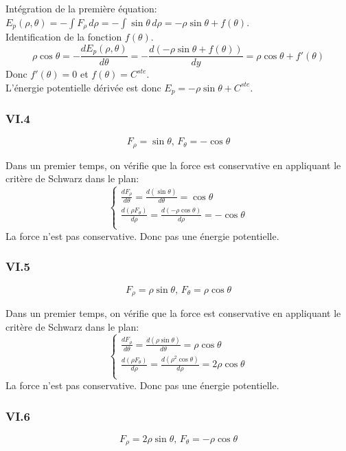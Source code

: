 \documentclass[]{book}
\theoremstyle{definition}
\begin{document}
Int\'egration de la premi\`ere \'equation: $E_p(\rho,\theta) = -\int{F_{\rho}\, d\rho} = -\int{\sin \theta\, d\rho} = -\rho \sin \theta + f(\theta)$.\\
Identification de la fonction $f(\theta)$. 
$$\rho \cos \theta = -\frac{dE_p(\rho,\theta)}{d\theta} = -\frac{d(-\rho \sin \theta + f(\theta))}{dy} = \rho \cos \theta + f'(\theta)$$
Donc $f'(\theta) = 0$ et $f(\theta) = C^{ste}$.\\

L'\'energie potentielle d\'eriv\'ee est donc $E_p = -\rho \sin \theta + C^{ste}$.

\subsubsection*{VI.4}
$$F_{\rho} = \sin \theta,\, F_{\theta} = -\cos \theta$$

Dans un premier temps, on v\'erifie que la force est conservative en appliquant le crit\`ere de Schwarz dans le plan:
$$
\left\{
\begin{array}{l }
	\frac{dF_{\rho}}{d\theta} = \frac{d(\sin \theta)}{d\theta} = \cos \theta\\
	\frac{d(\rho F_{\theta})}{d\rho} = \frac{d(-\rho \cos \theta)}{d\rho} = -\cos \theta\\
\end{array}
\right. 
$$
La force n'est pas conservative. Donc pas une \'energie potentielle.

\subsubsection*{VI.5}
$$F_{\rho} = \rho \sin \theta,\, F_{\theta} = \rho \cos \theta$$

Dans un premier temps, on v\'erifie que la force est conservative en appliquant le crit\`ere de Schwarz dans le plan:
$$
\left\{
\begin{array}{l }
	\frac{dF_{\rho}}{d\theta} = \frac{d(\rho \sin \theta)}{d\theta} = \rho \cos \theta\\
	\frac{d(\rho F_{\theta})}{d\rho} = \frac{d(\rho^2 \cos \theta)}{d\rho} = 2\rho \cos \theta\\
\end{array}
\right. 
$$
La force n'est pas conservative. Donc pas une \'energie potentielle.

\subsubsection*{VI.6}
$$F_{\rho} = 2\rho \sin \theta,\, F_{\theta} = -\rho \cos \theta$$
\end{document}
